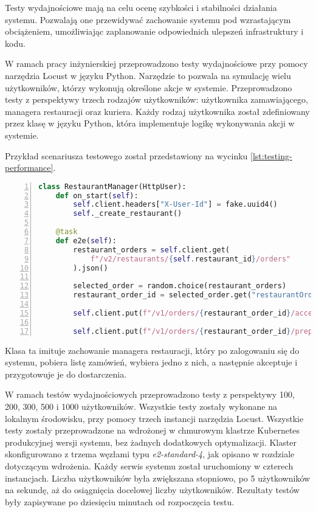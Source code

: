 Testy wydajnościowe mają na celu ocenę szybkości i stabilności działania systemu. Pozwalają one przewidywać zachowanie systemu pod wzrastającym obciążeniem, umożliwiając zaplanowanie odpowiednich ulepszeń infrastruktury i kodu.

W ramach pracy inżynierskiej przeprowadzono testy wydajnościowe przy pomocy narzędzia Locust \cite{locust} w języku Python. Narzędzie to pozwala na symulację wielu użytkowników, którzy wykonują określone akcje w systemie. Przeprowadzono testy z perspektywy trzech rodzajów użytkowników: użytkownika zamawiającego, managera restauracji oraz kuriera. Każdy rodzaj użytkownika został zdefiniowany przez klasę w języku Python, która implementuje logikę wykonywania akcji w systemie. 

Przykład scenariusza testowego został przedstawiony na wycinku \ref{lst:testing-performance}.

\begin{lstlisting}[caption={Scenariusz testowy w ramach testów wydajnościowych obsługujących managera restauracji},label={lst:testing-performance},captionpos=b,language=Python,numbers=left]
class RestaurantManager(HttpUser):
    def on_start(self):
        self.client.headers["X-User-Id"] = fake.uuid4()
        self._create_restaurant()

    @task
    def e2e(self):
        restaurant_orders = self.client.get(
            f"/v2/restaurants/{self.restaurant_id}/orders"
        ).json()

        selected_order = random.choice(restaurant_orders)
        restaurant_order_id = selected_order.get("restaurantOrderId")

        self.client.put(f"/v1/orders/{restaurant_order_id}/accept")

        self.client.put(f"/v1/orders/{restaurant_order_id}/prepare" )
\end{lstlisting}

Klasa ta imituje zachowanie managera restauracji, który po zalogowaniu się do systemu, pobiera listę zamówień, wybiera jedno z nich, a następnie akceptuje i przygotowuje je do dostarczenia.

W ramach testów wydajnościowych przeprowadzono testy z perspektywy 100, 200, 300, 500 i 1000 użytkowników. Wszystkie testy zostały wykonane na lokalnym środowisku, przy pomocy trzech instancji narzędzia Locust. Wszystkie testy zostały przeprowadzone na wdrożonej w chmurowym klastrze Kubernetes produkcyjnej wersji systemu, bez żadnych dodatkowych optymalizacji. Klaster skonfigurowano z trzema węzłami typu \textit{e2-standard-4}, jak opisano w rozdziale dotyczącym wdrożenia. Każdy serwis systemu został uruchomiony w czterech instancjach. Liczba użytkowników była zwiększana stopniowo, po 5 użytkowników na sekundę, aż do osiągnięcia docelowej liczby użytkowników. Rezultaty testów były zapisywane po dziesięciu minutach od rozpoczęcia testu. 

